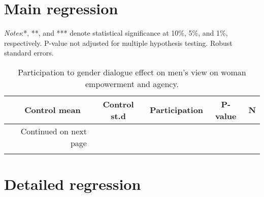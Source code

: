 \documentclass[10pt,a4paper, margin=1in]{article}
\begin{document}
\tableofcontents

\listoftables
\listoffigures

\pagebreak

\section{Main regression}

\begin{center}
	{\tiny \tabcolsep=1pt  %
		\begin{ThreePartTable}
			\begin{TableNotes}[flushleft]
				\tiny
				\item \textit{Notes}:*, **, and *** denote statistical significance at 10\%, 5\%, and 1\%, respectively. P-value not adjusted for multiple hypothesis testing. Robust standard errors.
			\end{TableNotes}
			\begin{longtable}{l*{5}{c}}
				\caption{Participation to gender dialogue effect on men's view on woman empowerment and agency.}\label{tab:balance_omni}					\\
				\toprule
				\hline 
				&\multicolumn{1}{p{1cm}}{\centering Control mean}
				&\multicolumn{1}{p{1cm}}{\centering Control st.d}
				&\multicolumn{1}{p{2cm}}{\centering Participation}
				&\multicolumn{1}{p{1cm}}{\centering P-value}
				&\multicolumn{1}{p{1cm}}{\centering N} \\
				\hline 
				\endfirsthead
				\hline
				\endhead
				\hline
				\multicolumn{2}{r}{{Continued on next page}} \\
				\endfoot
				
				\bottomrule
				\insertTableNotes
				\endlastfoot
				
			\end{longtable}
		\end{ThreePartTable}
	}
\end{center}

\section{Detailed regression}
\end{document}
